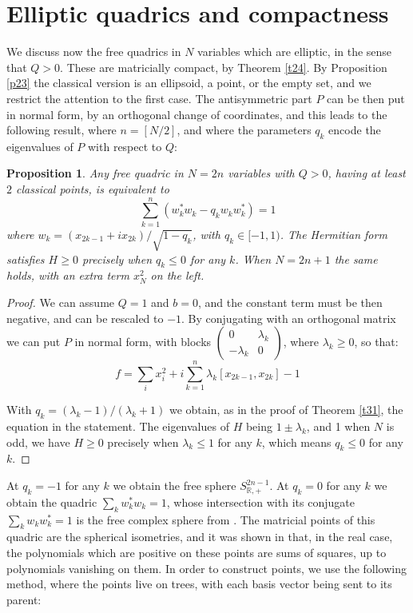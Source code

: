 \documentclass[11pt]{amsart}
\newtheorem{proposition}[theorem]{Proposition}
\theoremstyle{definition}
\begin{document}
\section{Elliptic quadrics and compactness}

We discuss now the free quadrics in $N$ variables which are elliptic, in the sense that $Q>0$. These are matricially compact, by Theorem \ref{t24}. By Proposition \ref{p23} the classical version is an ellipsoid, a point, or the empty set, and we restrict the attention to the first case. The antisymmetric part $P$ can be then put in normal form, by an orthogonal change of coordinates, and this leads to the following result, where $n=[N/2]$, and where the parameters $q_k$ encode the eigenvalues of $P$ with respect to $Q$:

\begin{proposition}
Any free quadric in $N=2n$ variables with $Q>0$, having at least $2$ classical points, is equivalent to
$$\sum_{k=1}^n\left(w_k^*w_k-q_kw_kw_k^*\right)=1$$
where $w_k=(x_{2k-1}+ix_{2k})/\sqrt{1-q_k}$, with $q_k\in[-1,1)$. The Hermitian form satisfies $H\geq0$ precisely when $q_k\leq0$ for any $k$. When $N=2n+1$ the same holds, with an extra term $x_N^2$ on the left.
\end{proposition}

\begin{proof}
We can assume $Q=1$ and $b=0$, and the constant term must be then negative, and can be rescaled to $-1$. By conjugating with an orthogonal matrix we can put $P$ in normal form, with blocks $\begin{pmatrix}0&\lambda_k\\-\lambda_k&0\end{pmatrix}$, where $\lambda_k\geq0$, so that:
$$f=\sum_ix_i^2+i\sum_{k=1}^n\lambda_k[x_{2k-1},x_{2k}]-1$$

With $q_k=(\lambda_k-1)/(\lambda_k+1)$ we obtain, as in the proof of Theorem \ref{t31}, the equation in the statement. The eigenvalues of $H$ being $1\pm\lambda_k$, and 1 when $N$ is odd, we have $H\geq0$ precisely when $\lambda_k\leq1$ for any $k$, which means $q_k\leq0$ for any $k$.
\end{proof}

At $q_k=-1$ for any $k$ we obtain the free sphere $S^{2n-1}_{\mathbb R,+}$. At $q_k=0$ for any $k$ we obtain the quadric $\sum_kw_k^*w_k=1$, whose intersection with its conjugate $\sum_kw_kw_k^*=1$ is the free complex sphere from \cite{ban}. The matricial points of this quadric are the spherical isometries, and it was shown in \cite{hmp} that, in the real case, the polynomials which are positive on these points are sums of squares, up to polynomials vanishing on them. In order to construct points, we use the following method, where the points live on trees, with each basis vector being sent to its parent:
\end{document}
